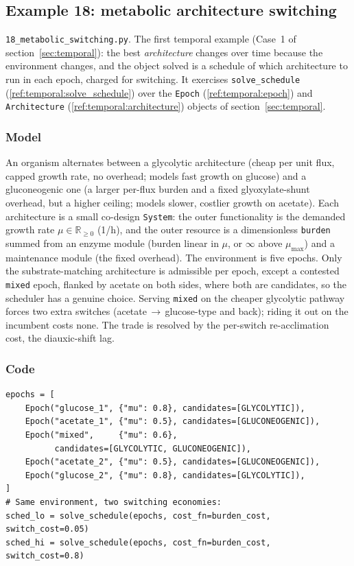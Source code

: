 \documentclass[11pt,a4paper]{article}
\newcommand{\Rplus}{\mathbb{R}_{\geq 0}}
\begin{document}
\subsection{Example 18: metabolic architecture switching}
\label{ex:18}

\texttt{18\_metabolic\_switching.py}. The first temporal example
(Case~1 of section~\ref{sec:temporal}): the best \emph{architecture}
changes over time because the environment changes, and the object solved
is a schedule of which architecture to run in each epoch, charged for
switching. It exercises \texttt{solve\_schedule}
(\ref{ref:temporal:solve_schedule}) over the \texttt{Epoch}
(\ref{ref:temporal:epoch}) and \texttt{Architecture}
(\ref{ref:temporal:architecture}) objects of
section~\ref{sec:temporal}.

\subsubsection*{Model}
An organism alternates between a glycolytic architecture (cheap per unit
flux, capped growth rate, no overhead; models fast growth on glucose) and
a gluconeogenic one (a larger per-flux burden and a fixed
glyoxylate-shunt overhead, but a higher ceiling; models slower, costlier
growth on acetate). Each architecture is a small co-design
\texttt{System}: the outer functionality is the demanded growth rate
$\mu\in\Rplus$ (1/h), and the outer resource is a dimensionless
\texttt{burden} summed from an enzyme module (burden linear in $\mu$, or
$\infty$ above $\mu_{\max}$) and a maintenance module (the fixed
overhead). The environment is five epochs. Only the substrate-matching
architecture is admissible per epoch, except a contested \texttt{mixed}
epoch, flanked by acetate on both sides, where both are candidates, so
the scheduler has a genuine choice. Serving \texttt{mixed} on the cheaper
glycolytic pathway forces two extra switches (acetate\,$\to$\,glucose-type
and back); riding it out on the incumbent costs none. The trade is
resolved by the per-switch re-acclimation cost, the diauxic-shift lag.

\subsubsection*{Code}
\begin{lstlisting}
epochs = [
    Epoch("glucose_1", {"mu": 0.8}, candidates=[GLYCOLYTIC]),
    Epoch("acetate_1", {"mu": 0.5}, candidates=[GLUCONEOGENIC]),
    Epoch("mixed",     {"mu": 0.6},
          candidates=[GLYCOLYTIC, GLUCONEOGENIC]),
    Epoch("acetate_2", {"mu": 0.5}, candidates=[GLUCONEOGENIC]),
    Epoch("glucose_2", {"mu": 0.8}, candidates=[GLYCOLYTIC]),
]
# Same environment, two switching economies:
sched_lo = solve_schedule(epochs, cost_fn=burden_cost, switch_cost=0.05)
sched_hi = solve_schedule(epochs, cost_fn=burden_cost, switch_cost=0.8)
\end{lstlisting}
\end{document}
